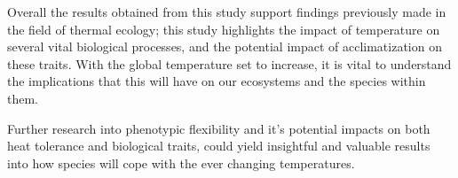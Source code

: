 \documentclass[../../Paper.tex]{subfiles}
\begin{document}
Overall the results obtained from this study support findings previously made in
the field of thermal ecology; this study highlights the impact of temperature on several
vital biological processes, and the potential impact of acclimatization on these traits. With
the global temperature set to increase, it is vital to understand the implications that
this will have on our ecosystems and the species within them.

Further research into phenotypic flexibility and it's potential impacts on both heat tolerance 
and biological traits, could yield insightful and valuable results into how species will
cope with the ever changing temperatures. 
\end{document}
